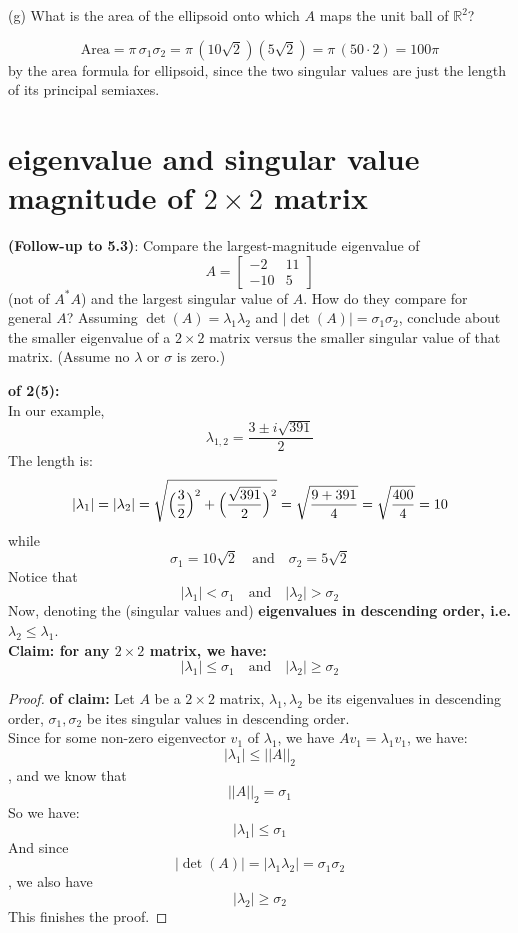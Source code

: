 \documentclass[lang=cn,11pt]{elegantbook}
\begin{document}
    (g) What is the area of the ellipsoid onto which $A$ maps the unit ball of $\mathbb{R}^2$?\\
\begin{solution}
\[
\text{Area}=\pi\,\sigma_1\sigma_2=\pi\,(10\sqrt2)(5\sqrt2)=\pi\,(50\cdot2)=100\pi
\]
by the area formula for ellipsoid, since the two singular values are just the length of its principal semiaxes.
\end{solution}    













\section{eigenvalue and singular value magnitude of $2 \times 2$ matrix}
\textbf{(Follow-up to 5.3)}: Compare the largest-magnitude eigenvalue of 
    \[
    A = \begin{bmatrix} -2 & 11 \\ -10 & 5 \end{bmatrix}
    \]
    (not of $A^* A$) and the largest singular value of $A$. How do they compare for general $A$? Assuming $\det(A) = \lambda_1 \lambda_2$ and $|\det(A)| = \sigma_1 \sigma_2$, conclude about the smaller eigenvalue of a $2 \times 2$ matrix versus the smaller singular value of that matrix. (Assume no $\lambda$ or $\sigma$ is zero.)
\begin{solution}
    \textbf{of 2(5):}\\
In our example, 
\[
\lambda_{1,2}=\frac{3\pm i\sqrt{391}}{2}
\] The length is:
\[
|\lambda_{1}|=|\lambda_{2}|=\sqrt{\Bigl(\frac{3}{2}\Bigr)^2+\Bigl(\frac{\sqrt{391}}{2}\Bigr)^2}=\sqrt{\frac{9+391}{4}}=\sqrt{\frac{400}{4}}=10
\]
while
\[
\sigma_1=10\sqrt2 \quad \text{and} \quad \sigma_2=5\sqrt2
\]
Notice that
$$
  |\lambda_1| <\sigma_1 \quad \text{and} \quad |\lambda_2| > \sigma_2
$$
Now, denoting the (singular values and) \textbf{eigenvalues in descending order, i.e.} $\lambda_2 \leq \lambda_1$.\\
\textbf{Claim: for any  $2 \times 2$ matrix, we have: \[
  |\lambda_1|\le \sigma_1 \quad \text{and} \quad |\lambda_2| \ge \sigma_2
  \]}\begin{proof} \textbf{of claim:}
Let $A$ be a $2 \times 2$ matrix, $\lambda_1,\lambda_2$ be its eigenvalues in descending order, $\sigma_1,\sigma_2$ be ites singular values in descending order.\\
Since for some non-zero eigenvector $v_1$ of $\lambda_1$, we have $A v_1  = \lambda_1 v_1$, we have:
$$
|\lambda_1| \leq ||A||_2
$$, and we know that 
$$
||A||_2 = \sigma_1
$$
So we have:
$$
|\lambda_1| \leq \sigma_1
$$
And since 
$$
|\det (A)| = |\lambda_1 \lambda_2| = \sigma_1\sigma_2 
$$, we also have 
$$
|\lambda_2| \geq \sigma_2
$$
This finishes the proof.  \end{proof}


\end{solution}
\end{document}
